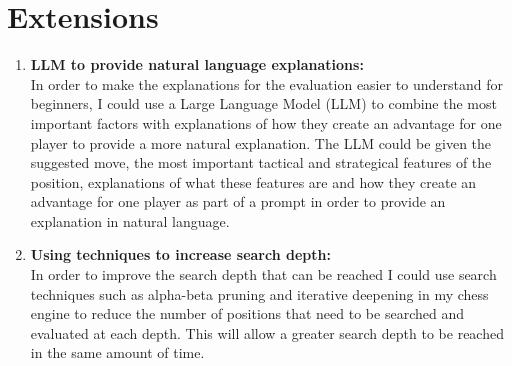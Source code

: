 \documentclass[12pt,a4paper]{article}
\begin{document}
\section*{Extensions}
\begin{enumerate}
    \item \textbf{LLM to provide natural language explanations:}
    \\In order to make the explanations for the evaluation easier to understand for beginners, I could use a Large Language Model (LLM) to combine the most important factors with explanations of how they create an advantage for one player to provide a more natural explanation. The LLM could be given the suggested move, the most important tactical and strategical features of the position, explanations of what these features are and how they create an advantage for one player as part of a prompt in order to provide an explanation in natural language.
    \item \textbf{Using techniques to increase search depth:}
    \\In order to improve the search depth that can be reached I could use search techniques such as alpha-beta pruning and iterative deepening in my chess engine to reduce the number of positions that need to be searched and evaluated at each depth. This will allow a greater search depth to be reached in the same amount of time.
\end{enumerate}
\end{document}

